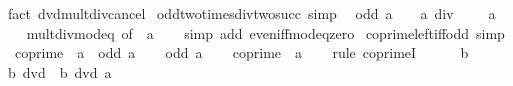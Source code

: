 \begin{isabellebody}
\ {\isacharparenleft}{\kern0pt}fact\ dvd{\isacharunderscore}{\kern0pt}mult{\isacharunderscore}{\kern0pt}div{\isacharunderscore}{\kern0pt}cancel{\isacharparenright}{\kern0pt}%
\endisatagproof
{\isafoldproof}%
%
\isadelimproof
\isanewline
%
\endisadelimproof
\isanewline
{}\isamarkupfalse%
\ odd{\isacharunderscore}{\kern0pt}two{\isacharunderscore}{\kern0pt}times{\isacharunderscore}{\kern0pt}div{\isacharunderscore}{\kern0pt}two{\isacharunderscore}{\kern0pt}succ\ {\isacharbrackleft}{\kern0pt}simp{\isacharbrackright}{\kern0pt}{\isacharcolon}{\kern0pt}\isanewline
\ \ {\isachardoublequoteopen}odd\ a\ {\isasymLongrightarrow}\ {}\ {\isacharasterisk}{\kern0pt}\ {\isacharparenleft}{\kern0pt}a\ div\ {}{\isacharparenright}{\kern0pt}\ {\isacharplus}{\kern0pt}\ {}\ {\isacharequal}{\kern0pt}\ a{\isachardoublequoteclose}\isanewline
%
\isadelimproof
\ \ %
\endisadelimproof
%
\isatagproof
{}\isamarkupfalse%
\ mult{\isacharunderscore}{\kern0pt}div{\isacharunderscore}{\kern0pt}mod{\isacharunderscore}{\kern0pt}eq\ {\isacharbrackleft}{\kern0pt}of\ {}\ a{\isacharbrackright}{\kern0pt}\isanewline
\ \ \isamarkupfalse%
\ {\isacharparenleft}{\kern0pt}simp\ add{\isacharcolon}{\kern0pt}\ even{\isacharunderscore}{\kern0pt}iff{\isacharunderscore}{\kern0pt}mod{\isacharunderscore}{\kern0pt}{}{\isacharunderscore}{\kern0pt}eq{\isacharunderscore}{\kern0pt}zero{\isacharparenright}{\kern0pt}%
\endisatagproof
{\isafoldproof}%
%
\isadelimproof
\isanewline
%
\endisadelimproof
\isanewline
{}\isamarkupfalse%
\ coprime{\isacharunderscore}{\kern0pt}left{\isacharunderscore}{\kern0pt}{}{\isacharunderscore}{\kern0pt}iff{\isacharunderscore}{\kern0pt}odd\ {\isacharbrackleft}{\kern0pt}simp{\isacharbrackright}{\kern0pt}{\isacharcolon}{\kern0pt}\isanewline
\ \ {\isachardoublequoteopen}coprime\ {}\ a\ {\isasymlongleftrightarrow}\ odd\ a{\isachardoublequoteclose}\isanewline
%
\isadelimproof
%
\endisadelimproof
%
\isatagproof
{}\isamarkupfalse%
\isanewline
\ \ \isamarkupfalse%
\ {\isachardoublequoteopen}odd\ a{\isachardoublequoteclose}\isanewline
\ \ \isamarkupfalse%
\ {\isachardoublequoteopen}coprime\ {}\ a{\isachardoublequoteclose}\isanewline
\ \ \isamarkupfalse%
\ {\isacharparenleft}{\kern0pt}rule\ coprimeI{\isacharparenright}{\kern0pt}\isanewline
\ \ \ \ \isamarkupfalse%
\ b\isanewline
\ \ \ \ \isamarkupfalse%
\ {\isachardoublequoteopen}b\ dvd\ {}{\isachardoublequoteclose}\ {\isachardoublequoteopen}b\ dvd\ a{\isachardoublequoteclose}\isanewline

\end{isabellebody}
